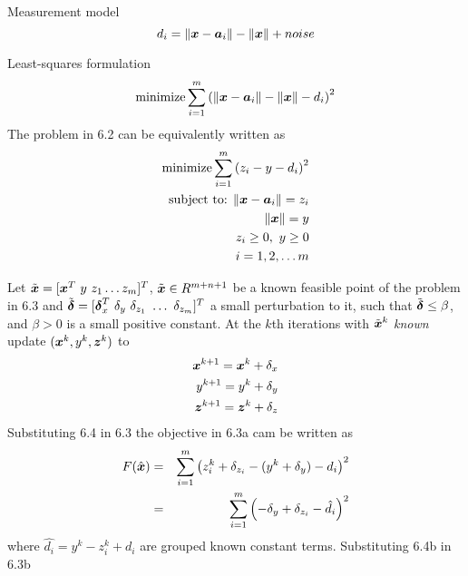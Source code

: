 Measurement model
\begin{equation} \label{eq:6.1}
d_i = \|\mbox{\boldmath$x$} - \mbox{\boldmath$a$}_i\| - \|\mbox{\boldmath$x$}\| + noise
\end{equation}

Least-squares formulation
\begin{equation} \label{eq:6.2}
\mathop{\mbox{minimize}} \sum^m_{i=1}\left( \|\mbox{\boldmath$x$} - \mbox{\boldmath$a$}_i\| - \|\mbox{\boldmath$x$}\| - d_i\right)^2
\end{equation}
The problem in 6.2 can be equivalently written as
\begin{eqnarray} \label{eq:6.3}
\mathop{\mbox{minimize}} \sum^m_{i=1}\left( z_i - y - d_i\right)^2\\
\nonumber
\mbox{subject to: } \|\mbox{\boldmath$x$} - \mbox{\boldmath$a$}_i\| = z_i \\
\nonumber
\|\mbox{\boldmath$x$}\| = y \\
\nonumber
z_i \geq 0, \ y \geq 0
\\ \nonumber  i = 1, 2, \ldots m
\end{eqnarray}

Let $\tilde{\mbox{\boldmath$x$}} = [\mbox{\boldmath$x$}^T \ y \ z_1 \ldots z_m]^T$, $\tilde{\mbox{\boldmath$x$}} \in R^{m+n+1}$ be a known feasible point of the problem in 6.3 and $\tilde{\Bdelta} = [\Bdelta_x^T \  \delta_y \ \delta_{z_1} \ \ldots \  \delta_{z_m}]^T$ a small perturbation to it, such that $\tilde{\mbox{\boldmath${\delta}$}} \leq \beta$, and $\beta > 0$ is a small positive constant. At the $k$th iterations with $\tilde{\mbox{\boldmath$x$}}^k$ \textit{known} update $(\mbox{\boldmath$x$}^k, y^k, \mbox{\boldmath$z$}^k)$ to 
\begin{eqnarray} \label{eq:6.4}
\mbox{\boldmath$x$}^{k+1} = \mbox{\boldmath$x$}^k + \delta_x \\
\nonumber
y^{k+1} = y^k + \delta_y \\
\nonumber
\mbox{\boldmath$z$}^{k+1} = \mbox{\boldmath$z$}^k + \delta_z
\end{eqnarray}
Substituting 6.4 in 6.3 the objective in 6.3a cam be written as
\begin{eqnarray} \label{eq:6.5}
F(\hat{\mbox{\boldmath$x$}}) & =  & \sum^m_{i = 1} \left(z^k_i + \delta_{z_i} - (y^k + \delta_y) - d_i \right)^2 \\
\nonumber
& = & \sum^m_{i = 1} \left(- \delta_y + \delta_{z_i}  - \hat{d_i} \right)^2
\end{eqnarray}
where $\hat{d_i} = y^k - z_i^k + d_i$ are grouped known constant terms.
Substituting 6.4b in 6.3b